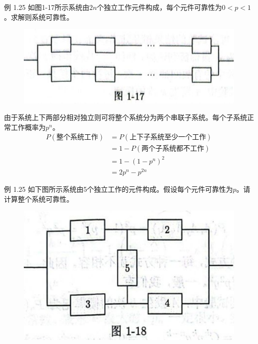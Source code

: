\documentclass{beamer}
\begin{document}
	\begin{frame}
		例 1.25 如图1-17所示系统由$2n$个独立工作元件构成，每个元件可靠性为$0 < p < 1$。求解则系统可靠性。
		\begin{figure}[H]
			\centering
			\includegraphics[scale = 0.04]{figures/figure1-17}
		\end{figure}
	\end{frame}
	
	\begin{frame}
		由于系统上下两部分相对独立则可将整个系统分为两个串联子系统。每个子系统正常工作概率为$p^n$。
		\begin{align}
			P(\text{整个系统工作}) & = P(\text{上下子系统至少一个工作}) \\
			& = 1 - P(\text{两个子系统都不工作}) \\
			& = 1 - (1 - p^n)^2\\
			& = 2p^n - p^{2n}
		\end{align}
	\end{frame}
	
	\begin{frame}
		例 1.25 如下图所示系统由5个独立工作的元件构成。假设每个元件可靠性为$p$。请计算整个系统可靠性。
		\begin{figure}
			\centering
			\includegraphics[scale = 0.04]{figures/figure1-18}
		\end{figure}
	\end{frame}
	
\end{document}
